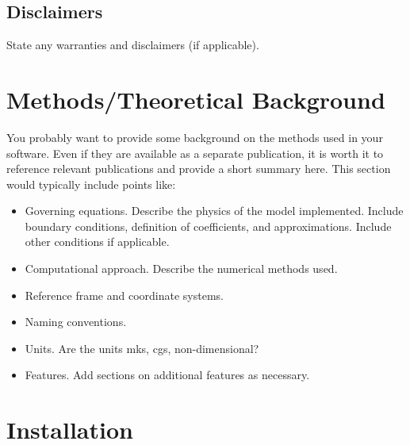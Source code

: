 \documentclass{article}
\begin{document}
\subsection{Disclaimers} State any warranties and disclaimers (if applicable).

\section{Methods/Theoretical Background}

You probably want to provide some background on the methods used in your software. Even if they are available as a separate publication, it is worth it to reference relevant publications and provide a short summary here. 
This section would typically include points like:

\begin{itemize}
\item Governing equations. Describe the physics of the model implemented. Include boundary conditions, definition of coefficients, and approximations. Include other conditions if applicable.
\item Computational approach. Describe the numerical methods used.
\item Reference frame and coordinate systems.
\item Naming conventions.
\item Units. Are the units mks, cgs, non-dimensional?
\item Features. Add sections on additional features as necessary.

\end{itemize}

\section{Installation}
\end{document}
